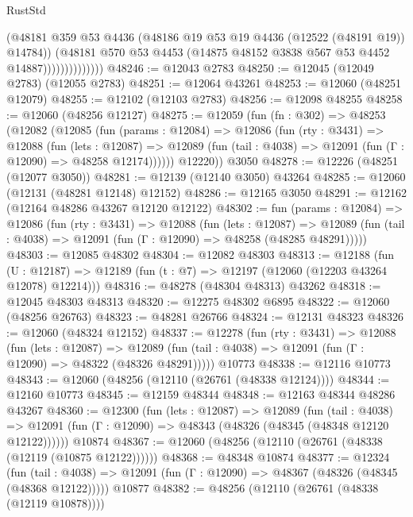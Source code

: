 \begin{lexlean}{RustStd}
\begin{coremodule}
                            (@48181
                              @359
                              @53
                              @4436
                              (@48186 @19 @53 @19 @4436 (@12522 (@48191 @19)) @14784))
                            (@48181
                              @570
                              @53
                              @4453
                              (@14875 @48152 @3838 @567 @53 @4452 @14887))))))))))))))
@48246 := @12043 @2783
@48250 := @12045 (@12049 @2783) (@12055 @2783)
@48251 := @12064 @43261
@48253 := @12060 (@48251 @12079)
@48255 := @12102 (@12103 @2783)
@48256 := @12098 @48255
@48258 := @12060 (@48256 @12127)
@48275 := @12059
    (fun (fn : @302) =>
    @48253
      (@12082
        (@12085
          (fun (params : @12084) =>
          @12086
            (fun (rty : @3431) =>
            @12088
              (fun (lets : @12087) =>
              @12089 (fun (tail : @4038) => @12091 (fun (Γ : @12090) => @48258 @12174))))))
        @12220))
    @3050
@48278 := @12226 (@48251 (@12077 @3050))
@48281 := @12139 (@12140 @3050) @43264
@48285 := @12060 (@12131 (@48281 @12148) @12152)
@48286 := @12165 @3050
@48291 := @12162 (@12164 @48286 @43267 @12120 @12122)
@48302 := fun (params : @12084) =>
  @12086
    (fun (rty : @3431) =>
    @12088
      (fun (lets : @12087) =>
      @12089 (fun (tail : @4038) => @12091 (fun (Γ : @12090) => @48258 (@48285 @48291)))))
@48303 := @12085 @48302
@48304 := @12082 @48303
@48313 := @12188
    (fun (U : @12187) => @12189 (fun (t : @7) => @12197 (@12060 (@12203 @43264 @12078) @12214)))
@48316 := @48278 (@48304 @48313) @43262
@48318 := @12045 @48303 @48313
@48320 := @12275 @48302 @6895
@48322 := @12060 (@48256 @26763)
@48323 := @48281 @26766
@48324 := @12131 @48323
@48326 := @12060 (@48324 @12152)
@48337 := @12278
    (fun (rty : @3431) =>
    @12088
      (fun (lets : @12087) =>
      @12089 (fun (tail : @4038) => @12091 (fun (Γ : @12090) => @48322 (@48326 @48291)))))
    @10773
@48338 := @12116 @10773
@48343 := @12060 (@48256 (@12110 (@26761 (@48338 @12124))))
@48344 := @12160 @10773
@48345 := @12159 @48344
@48348 := @12163 @48344 @48286 @43267
@48360 := @12300
    (fun (lets : @12087) =>
    @12089
      (fun (tail : @4038) =>
      @12091 (fun (Γ : @12090) => @48343 (@48326 (@48345 (@48348 @12120 @12122))))))
    @10874
@48367 := @12060 (@48256 (@12110 (@26761 (@48338 (@12119 (@10875 @12122))))))
@48368 := @48348 @10874
@48377 := @12324
    (fun (tail : @4038) => @12091 (fun (Γ : @12090) => @48367 (@48326 (@48345 (@48368 @12122)))))
    @10877
@48382 := @48256 (@12110 (@26761 (@48338 (@12119 @10878))))

\end{coremodule}
\end{lexlean}
